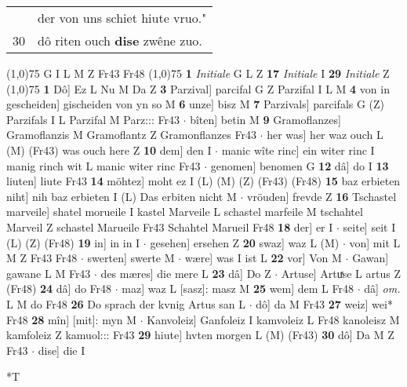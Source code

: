 \documentclass[8pt,a4paper,notitlepage]{article}
\begin{document}
\begin{table}[ht]
\begin{minipage}[t]{0.5\linewidth}
\begin{tabular}{rl}
 & der von uns schiet hiute vruo."\\ 
30 & dô riten ouch \textbf{dise} zwêne zuo.\\ 
\end{tabular}
\scriptsize
\line(1,0){75} \newline
G I L M Z Fr43 Fr48 \newline
\line(1,0){75} \newline
\textbf{1} \textit{Initiale} G L Z  \textbf{17} \textit{Initiale} I  \textbf{29} \textit{Initiale} Z  \newline
\line(1,0){75} \newline
\textbf{1} Dô] Ez L Nu M Da Z \textbf{3} Parzival] parcifal G Z Parzifal I L M \textbf{4} von in gescheiden] gischeiden von yn so M \textbf{6} unze] bisz M \textbf{7} Parzivals] parcifals G (Z) Parzifals I L Parzifal M Parz::: Fr43  $\cdot$ bîten] betin M \textbf{9} Gramoflanzes] Gramoflanzis M Gramoflantz Z Gramonflanzes Fr43  $\cdot$ her was] her waz ouch L (M) (Fr43) was ouch here Z \textbf{10} dem] den I  $\cdot$ manic wîte rinc] ein witer rinc I manig rinch wit L manic witer rinc Fr43  $\cdot$ genomen] benomen G \textbf{12} dâ] do I \textbf{13} liuten] liute Fr43 \textbf{14} möhtez] moht ez I (L) (M) (Z) (Fr43) (Fr48) \textbf{15} baz erbieten niht] nih baz erbieten I (L) Das erbiten nicht M  $\cdot$ vröuden] frevde Z \textbf{16} Tschastel marveile] shatel morueile I kastel Marveile L schastel marfeile M tschahtel Marveil Z schastel Marueile Fr43 Schahtel Marueil Fr48 \textbf{18} der] er I  $\cdot$ seite] seit I (L) (Z) (Fr48) \textbf{19} in] in in I  $\cdot$ gesehen] ersehen Z \textbf{20} swaz] waz L (M)  $\cdot$ von] mit L M Z Fr43 Fr48  $\cdot$ swerten] swerte M  $\cdot$ wære] was I ist L \textbf{22} vor] Von M  $\cdot$ Gawan] gawane L M Fr43  $\cdot$ des mæres] die mere L \textbf{23} dâ] Do Z  $\cdot$ Artuse] Artuͯse L artus Z (Fr48) \textbf{24} dâ] do Fr48  $\cdot$ maz] waz L [sasz]: masz M \textbf{25} wem] dem L Fr48  $\cdot$ dâ] \textit{om.} L M do Fr48 \textbf{26} Do sprach der kvnig Artus san L  $\cdot$ dô] da M Fr43 \textbf{27} weiz] wei* Fr48 \textbf{28} mîn] [mit]: myn M  $\cdot$ Kanvoleiz] Ganfoleiz I kamvoleiz L Fr48 kanoleisz M kamfoleiz Z kamuol::: Fr43 \textbf{29} hiute] hvten morgen L (M) (Fr43) \textbf{30} dô] Da M Z Fr43  $\cdot$ dise] die I \newline
\end{minipage}
\hspace{0.5cm}
\begin{minipage}[t]{0.5\linewidth}
\small
\begin{center}*T

\end{center}
\end{minipage}
\end{table}
\end{document}
